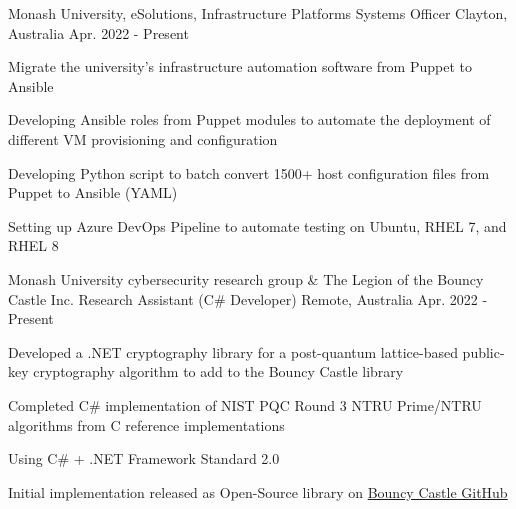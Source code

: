 

\begin{cventries}

  \cventry
  {Monash University, eSolutions, Infrastructure Platforms} %
  {Systems Officer} %
  {Clayton, Australia} %
  {Apr. 2022 - Present} %
  {
    \begin{cvitems} %
      \item {Migrate the university's infrastructure automation software from Puppet to Ansible}
      \item {Developing Ansible roles from Puppet modules to automate the deployment of different VM provisioning and configuration}
      \item {Developing Python script to batch convert 1500+ host configuration files from Puppet to Ansible (YAML)}
      \item {Setting up Azure DevOps Pipeline to automate testing on Ubuntu, RHEL 7, and RHEL 8}
    \end{cvitems}
  }

  \cventry
    {Monash University cybersecurity research group \& The Legion of the Bouncy Castle Inc.} %
    {Research Assistant (C\# Developer)} %
    {Remote, Australia} %
    {Apr. 2022 - Present} %
    {
      \begin{cvitems} %
        \item {Developed a .NET cryptography library for a post-quantum lattice-based public-key cryptography algorithm to add to the Bouncy Castle library}
        \item {Completed C\# implementation of NIST PQC Round 3 NTRU Prime/NTRU algorithms from C reference implementations}
        \item {Using C\# + .NET Framework Standard 2.0}
        \item {Initial implementation released as Open-Source library on \href{https://github.com/bcgit/bc-csharp}{Bouncy Castle GitHub}}
      \end{cvitems}
    }


\end{cventries}
\vspace{-3.0mm}